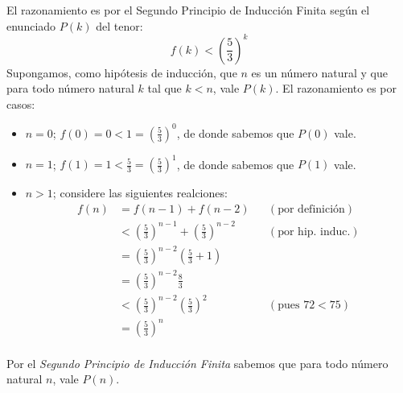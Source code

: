   \begin{solution}
    El razonamiento es por el Segundo Principio de Inducción Finita
    según el enunciado $P(k)$ del tenor:
    \begin{equation*}
      f(k)<\left(\frac{5}{3}\right)^{k}
    \end{equation*}
    Supongamos, como hipótesis de inducción, que $n$ es un número
    natural y que para todo número natural $k$ tal que $k<n$, vale $P(k)$. El
    razonamiento es por casos:
    \begin{itemize}
    \item $n=0$; $f(0)=0<1=\left(\frac{5}{3}\right)^{0}$, de donde sabemos que $P(0)$ vale.
    \item $n=1$; $f(1)=1<\frac{5}{3}=\left(\frac{5}{3}\right)^{1}$, de
      donde sabemos que $P(1)$ vale.
    \item $n>1$; considere las siguientes realciones:
      \begin{align*}
        f(n)&=f(n-1)+f(n-2)&& (\text{por definición})\\
            &<\left(\frac{5}{3}\right)^{n-1}+\left(\frac{5}{3}\right)^{n-2}&&(\text{por hip. induc.})\\
            &=\left(\frac{5}{3}\right)^{n-2}(\frac{5}{3}+1)&&\\
            &=\left(\frac{5}{3}\right)^{n-2}\frac{8}{3}&&\\
            &<\left(\frac{5}{3}\right)^{n-2}\left(\frac{5}{3}\right)^{2}&&(\text{pues }72<75)\\
            &=\left(\frac{5}{3}\right)^{n}&&\\            
      \end{align*}
    \end{itemize}
    Por el \textit{Segundo Principio de Inducción Finita} sabemos que
    para todo número natural $n$, vale $P(n)$.
  \end{solution}